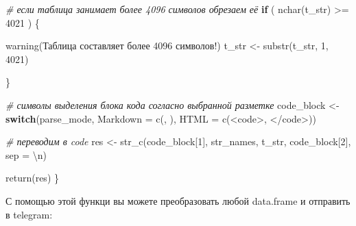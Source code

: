 \documentclass[
]{book}
\newenvironment{Shaded}{\begin{snugshade}}{\end{snugshade}}
\newcommand{\AttributeTok}[1]{\textcolor[rgb]{0.77,0.63,0.00}{#1}}
\newcommand{\CommentTok}[1]{\textcolor[rgb]{0.56,0.35,0.01}{\textit{#1}}}
\newcommand{\ControlFlowTok}[1]{\textcolor[rgb]{0.13,0.29,0.53}{\textbf{#1}}}
\newcommand{\DecValTok}[1]{\textcolor[rgb]{0.00,0.00,0.81}{#1}}
\newcommand{\FunctionTok}[1]{\textcolor[rgb]{0.00,0.00,0.00}{#1}}
\newcommand{\NormalTok}[1]{#1}
\newcommand{\OtherTok}[1]{\textcolor[rgb]{0.56,0.35,0.01}{#1}}
\newcommand{\SpecialCharTok}[1]{\textcolor[rgb]{0.00,0.00,0.00}{#1}}
\newcommand{\StringTok}[1]{\textcolor[rgb]{0.31,0.60,0.02}{#1}}
\begin{document}
\begin{Shaded}
\begin{Highlighting}[]
  \CommentTok{\# если таблица занимает более 4096 символов обрезаем её}
  \ControlFlowTok{if}\NormalTok{ ( }\FunctionTok{nchar}\NormalTok{(t\_str) }\SpecialCharTok{\textgreater{}=} \DecValTok{4021}\NormalTok{ ) \{}
    
    \FunctionTok{warning}\NormalTok{(}\StringTok{\textquotesingle{}Таблица составляет более 4096 символов!\textquotesingle{}}\NormalTok{)}
\NormalTok{    t\_str }\OtherTok{\textless{}{-}} \FunctionTok{substr}\NormalTok{(t\_str, }\DecValTok{1}\NormalTok{, }\DecValTok{4021}\NormalTok{)}
    
\NormalTok{  \}}
  
  \CommentTok{\# символы выделения блока кода согласно выбранной разметке}
\NormalTok{  code\_block }\OtherTok{\textless{}{-}} \ControlFlowTok{switch}\NormalTok{(parse\_mode, }
                       \StringTok{\textquotesingle{}Markdown\textquotesingle{}} \OtherTok{=} \FunctionTok{c}\NormalTok{(}\StringTok{\textquotesingle{}\textasciigrave{}\textasciigrave{}\textasciigrave{}\textquotesingle{}}\NormalTok{, }\StringTok{\textquotesingle{}\textasciigrave{}\textasciigrave{}\textasciigrave{}\textquotesingle{}}\NormalTok{),}
                       \StringTok{\textquotesingle{}HTML\textquotesingle{}} \OtherTok{=} \FunctionTok{c}\NormalTok{(}\StringTok{\textquotesingle{}\textless{}code\textgreater{}\textquotesingle{}}\NormalTok{, }\StringTok{\textquotesingle{}\textless{}/code\textgreater{}\textquotesingle{}}\NormalTok{))}
           
  \CommentTok{\# переводим в code}
\NormalTok{  res }\OtherTok{\textless{}{-}} \FunctionTok{str\_c}\NormalTok{(code\_block[}\DecValTok{1}\NormalTok{], str\_names, t\_str, code\_block[}\DecValTok{2}\NormalTok{], }\AttributeTok{sep =} \StringTok{\textquotesingle{}}\SpecialCharTok{\textbackslash{}n}\StringTok{\textquotesingle{}}\NormalTok{)}
  
  \FunctionTok{return}\NormalTok{(res)}
\NormalTok{\}}
\end{Highlighting}
\end{Shaded}

С помощью этой функци вы можете преобразовать любой data.frame и отправить в telegram:

\begin{Shaded}
\end{Shaded}
\end{document}
